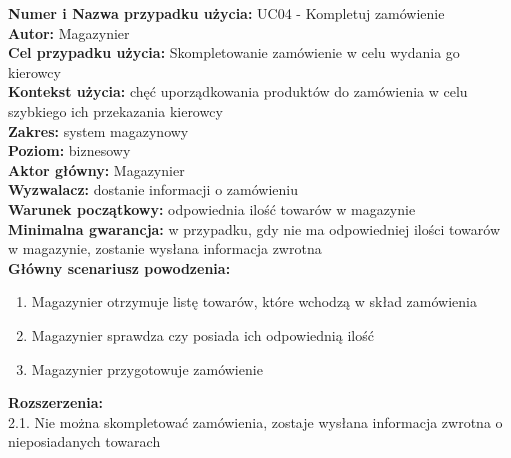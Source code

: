 \textbf{Numer i Nazwa przypadku użycia:} UC04 - Kompletuj zamówienie \\
\textbf{Autor:} Magazynier\\
\textbf{Cel przypadku użycia:} Skompletowanie zamówienie w celu wydania go kierowcy \\
\textbf{Kontekst użycia:} chęć uporządkowania produktów do zamówienia w celu szybkiego ich przekazania kierowcy \\
\textbf{Zakres:} system magazynowy \\
\textbf{Poziom:} biznesowy \\
\textbf{Aktor główny:} Magazynier \\
\textbf{Wyzwalacz:} dostanie informacji o zamówieniu \\
\textbf{Warunek początkowy:} odpowiednia ilość towarów w magazynie \\
\textbf{Minimalna gwarancja:} w przypadku, gdy nie ma odpowiedniej ilości towarów w magazynie, zostanie wysłana informacja zwrotna  \\
\textbf{Główny scenariusz powodzenia:} \\
	\begin{enumerate}
		\item Magazynier otrzymuje listę towarów, które wchodzą w skład zamówienia
		\item Magazynier sprawdza czy posiada ich odpowiednią ilość
		\item Magazynier przygotowuje zamówienie
	\end{enumerate}
\textbf{Rozszerzenia:} \\
2.1. Nie można skompletować zamówienia, zostaje wysłana informacja zwrotna o nieposiadanych towarach\\

